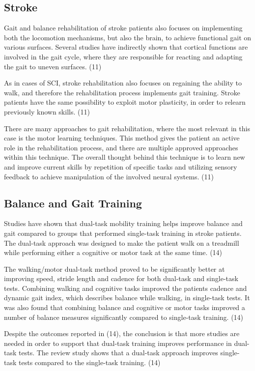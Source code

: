 \subsection{Stroke}

Gait and balance rehabilitation of stroke patients also focuses on implementing both the locomotion mechanisms, but also the brain, to achieve functional gait on various surfaces. Several studies have indirectly shown that cortical functions are involved in the gait cycle, where they are responsible for reacting and adapting the gait to uneven surfaces. (11)

As in cases of SCI, stroke rehabilitation also focuses on regaining the ability to walk, and therefore the rehabilitation process implements gait training. Stroke patients have the same possibility to exploit motor plasticity, in order to relearn previously known skills. (11)

There are many approaches to gait rehabilitation, where the most relevant in this case is the motor learning techniques. This method gives the patient an active role in the rehabilitation process, and there are multiple approved approaches within this technique. The overall thought behind this technique is to learn new and improve current skills by repetition of specific tasks and utilizing sensory feedback to achieve manipulation of the involved neural systems. (11)

\subsection{Balance and Gait Training}

Studies have shown that dual-task mobility training helps improve balance and gait compared to groups that performed single-task training in stroke patients. The dual-task approach was designed to make the patient walk on a treadmill while performing either a cognitive or motor task at the same time. (14)

The walking/motor dual-task method proved to be significantly better at improving speed, stride length and cadence for both dual-task and single-task tests. Combining walking and cognitive tasks improved the patients cadence and dynamic gait index, which describes balance while walking, in single-task tests. It was also found that combining balance and cognitive or motor tasks improved a number of balance measures significantly compared to single-task training. (14)

Despite the outcomes reported in (14), the conclusion is that more studies are needed in order to support that dual-task training improves performance in dual-task tests. The review study shows that a dual-task approach improves single-task tests compared to the single-task training. (14)

